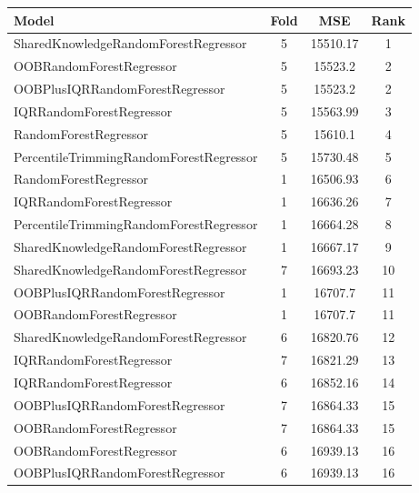 \begin{table}[h]
\centering
\begin{tabular}{|l|c|c|c|}
\hline
Model & Fold & MSE & Rank \\ \hline
\textcolor[HTML]{ef9b20}{SharedKnowledgeRandomForestRegressor} & 5 & 15510.17 & 1 \\ \hline
\textcolor[HTML]{b33dc6}{OOBRandomForestRegressor} & 5 & 15523.2 & 2 \\ \hline
\textcolor[HTML]{ede15b}{OOBPlusIQRRandomForestRegressor} & 5 & 15523.2 & 2 \\ \hline
\textcolor[HTML]{27aeef}{IQRRandomForestRegressor} & 5 & 15563.99 & 3 \\ \hline
\textcolor[HTML]{87bc45}{RandomForestRegressor} & 5 & 15610.1 & 4 \\ \hline
\textcolor[HTML]{f46a9b}{PercentileTrimmingRandomForestRegressor} & 5 & 15730.48 & 5 \\ \hline
\textcolor[HTML]{87bc45}{RandomForestRegressor} & 1 & 16506.93 & 6 \\ \hline
\textcolor[HTML]{27aeef}{IQRRandomForestRegressor} & 1 & 16636.26 & 7 \\ \hline
\textcolor[HTML]{f46a9b}{PercentileTrimmingRandomForestRegressor} & 1 & 16664.28 & 8 \\ \hline
\textcolor[HTML]{ef9b20}{SharedKnowledgeRandomForestRegressor} & 1 & 16667.17 & 9 \\ \hline
\textcolor[HTML]{ef9b20}{SharedKnowledgeRandomForestRegressor} & 7 & 16693.23 & 10 \\ \hline
\textcolor[HTML]{ede15b}{OOBPlusIQRRandomForestRegressor} & 1 & 16707.7 & 11 \\ \hline
\textcolor[HTML]{b33dc6}{OOBRandomForestRegressor} & 1 & 16707.7 & 11 \\ \hline
\textcolor[HTML]{ef9b20}{SharedKnowledgeRandomForestRegressor} & 6 & 16820.76 & 12 \\ \hline
\textcolor[HTML]{27aeef}{IQRRandomForestRegressor} & 7 & 16821.29 & 13 \\ \hline
\textcolor[HTML]{27aeef}{IQRRandomForestRegressor} & 6 & 16852.16 & 14 \\ \hline
\textcolor[HTML]{ede15b}{OOBPlusIQRRandomForestRegressor} & 7 & 16864.33 & 15 \\ \hline
\textcolor[HTML]{b33dc6}{OOBRandomForestRegressor} & 7 & 16864.33 & 15 \\ \hline
\textcolor[HTML]{b33dc6}{OOBRandomForestRegressor} & 6 & 16939.13 & 16 \\ \hline
\textcolor[HTML]{ede15b}{OOBPlusIQRRandomForestRegressor} & 6 & 16939.13 & 16 \\ \hline

\end{tabular}
\end{table}
